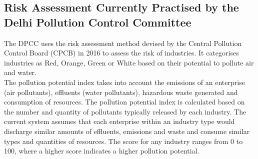 \documentclass[a4paper, 12pt]{article}
\begin{document}
                 \subsection{Risk Assessment Currently Practised by the Delhi Pollution Control Committee}
                 
                 The DPCC uses the risk assessment method devised by the Central Pollution Control Board (CPCB) in 2016 to assess the risk of industries. It categorises industries as Red, Orange, Green or White based on their potential to pollute air and water. \\
                 
                 The pollution potential index takes into account the emissions of an enterprise (air pollutants), effluents (water pollutants), hazardous waste generated and consumption of resources. The pollution potential index is calculated based on the number and quantity of pollutants typically released by each industry. The current system assumes that each enterprise within an industry type would discharge similar amounts of effluents, emissions and waste and consume similar types and quantities of resources. The score for any industry ranges from 0 to 100, where a higher score indicates a higher pollution potential. \\
                 
\end{document}
